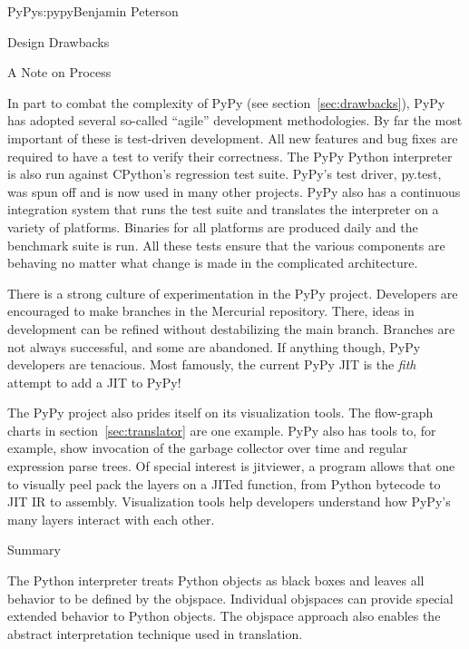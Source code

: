 \begin{aosachapter}{PyPy}{s:pypy}{Benjamin Peterson}
\begin{aosasect1}{Design Drawbacks}
\end{aosasect1}

\begin{aosasect1}{A Note on Process}

In part to combat the complexity of PyPy (see section~\ref{sec:drawbacks}), PyPy
has adopted several so-called ``agile'' development methodologies. By far the
most important of these is test-driven development. All new features and bug
fixes are required to have a test to verify their correctness. The PyPy Python
interpreter is also run against CPython's regression test suite. PyPy's test
driver, py.test, was spun off and is now used in many other projects. PyPy also
has a continuous integration system that runs the test suite and translates the
interpreter on a variety of platforms. Binaries for all platforms are produced
daily and the benchmark suite is run. All these tests ensure that the various
components are behaving no matter what change is made in the complicated
architecture.

There is a strong culture of experimentation in the PyPy project. Developers are
encouraged to make branches in the Mercurial repository. There, ideas in
development can be refined without destabilizing the main branch. Branches are
not always successful, and some are abandoned. If anything though, PyPy
developers are tenacious. Most famously, the current PyPy JIT is the \emph{fith}
attempt to add a JIT to PyPy!

The PyPy project also prides itself on its visualization tools. The flow-graph
charts in section~\ref{sec:translator} are one example. PyPy also has tools to,
for example, show invocation of the garbage collector over time and regular
expression parse trees. Of special interest is jitviewer, a program allows that
one to visually peel pack the layers on a JITed function, from Python bytecode
to JIT IR to assembly. Visualization tools help developers understand how PyPy's
many layers interact with each other.


\end{aosasect1}

\begin{aosasect1}{Summary}

The Python interpreter treats Python objects as black boxes and leaves all
behavior to be defined by the objspace. Individual objspaces can provide special
extended behavior to Python objects. The objspace approach also enables the
abstract interpretation technique used in translation.


\end{aosasect1}
\end{aosachapter}

